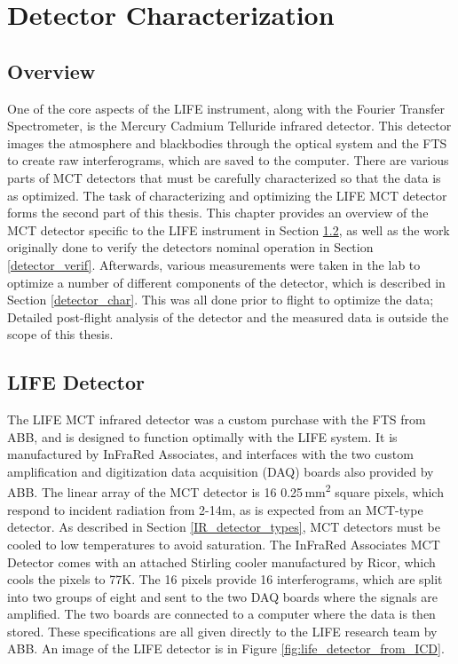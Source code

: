 \chapter{Detector Characterization} \label{detector}

\section{Overview}
One of the core aspects of the LIFE instrument, along with the Fourier Transfer Spectrometer, is the Mercury Cadmium Telluride infrared detector. This detector images the atmosphere and blackbodies through the optical system and the FTS to create raw interferograms, which are saved to the computer. There are various parts of MCT detectors that must be carefully characterized so that the data is as optimized. The task of characterizing and optimizing the LIFE MCT detector forms the second part of this thesis. This chapter provides an overview of the MCT detector specific to the LIFE instrument in Section \ref{ABB_detector}, as well as the work originally done to verify the detectors nominal operation in Section \ref{detector_verif}. Afterwards, various measurements were taken in the lab to optimize a number of different components of the detector, which is described in Section \ref{detector_char}. This was all done prior to flight to optimize the data; Detailed post-flight analysis of the detector and the measured data is outside the scope of this thesis.

\section{LIFE Detector}\label{ABB_detector}
The LIFE MCT infrared detector was a custom purchase with the FTS from ABB, and is designed to function optimally with the LIFE system. It is manufactured by InFraRed Associates, and interfaces with the two custom amplification and digitization data acquisition (DAQ) boards also provided by ABB. The linear array of the MCT detector is 16 0.25\,mm\textsuperscript{2} square pixels, which respond to incident radiation from 2-14\textmu m, as is expected from an MCT-type detector. As described in Section \ref{IR_detector_types}, MCT detectors must be cooled to low temperatures to avoid saturation. The InFraRed Associates MCT Detector comes with an attached Stirling cooler manufactured by Ricor, which cools the pixels to 77K. The 16 pixels provide 16 interferograms, which are split into two groups of eight and sent to the two DAQ boards where the signals are amplified. The two boards are connected to a computer where the data is then stored. These specifications are all given directly to the LIFE research team by ABB. An image of the LIFE detector is in Figure \ref{fig:life_detector_from_ICD}.

